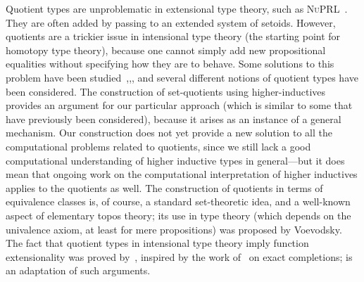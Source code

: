\documentclass[12pt]{article}
\newcommand{\NuPRL}{\textsc{NuPRL}\xspace}
\begin{document}
Quotient types are unproblematic in extensional type theory, such as \NuPRL~\cite{constable+86nuprl-book}.
They are often added by passing to an extended system of setoids.
However, quotients are a trickier issue in intensional type theory (the starting point for homotopy type theory), because one cannot simply add new propositional equalities without specifying how they are to behave. Some solutions to this problem have been studied~\cite{hofmann:thesis},\cite{Altenkirch1999},\cite{altenkirch+07ott}, and several different notions of quotient types have been considered.  The construction of set-quotients using higher-inductives provides an argument for our particular approach (which is similar to some that have previously been considered), because it arises as an instance of a general mechanism.  Our construction does not yet provide a new solution to all the computational problems related to quotients, since we still lack a good computational understanding of higher inductive types in general---but it does mean that ongoing work on the computational interpretation of higher inductives applies to the quotients as well.  The construction of quotients in terms of equivalence classes is, of
course, a standard set-theoretic idea, and a well-known aspect of elementary topos theory; its use in type theory (which depends on the univalence axiom, at least for mere propositions) was proposed by Voevodsky.  The fact that quotient types in intensional type theory imply function extensionality was proved by~\cite{hofmann:thesis}, inspired by the work of~\cite{carboni} on exact completions;  is an adaptation of such arguments.
\end{document}
